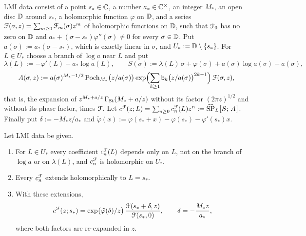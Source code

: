 \begin{defn}
\label{def:gam-lmidata}
LMI data consist of a point $s_*\in\mathbb{C}$, a number $a_*\in\mathbb{C}^\times$, an integer $M_*$, an open disc $\mathbb{D}$ around $s_*$, a holomorphic function $\varphi$ on $\mathbb{D}$, and a series $\mathcal{F}(\sigma,z)=\sum_{m\geq0}\mathcal{F}_m(\sigma)z^m$ of holomorphic functions on $\mathbb{D}$, such that $\mathcal{F}_0$ has no zero on $\mathbb{D}$ and $a_*+(\sigma-s_*)\varphi''(\sigma)\neq0$ for every $\sigma\in\mathbb{D}$. Put $a(\sigma):=a_*(\sigma-s_*)$, which is exactly linear in $\sigma$, and $U_*:=\mathbb{D}\setminus\{s_*\}$. For $L\in U_*$ choose a branch of $\log a$ near $L$ and put
\[
\lambda(L):=-\varphi'(L)-a_*\log a(L),\qquad S(\sigma):=\lambda(L)\,\sigma+\varphi(\sigma)+a(\sigma)\log a(\sigma)-a(\sigma),
\]
\[
A(\sigma,z):=a(\sigma)^{M_*-1/2}\,\mathrm{Poch}_{M_*}\bigl(z/a(\sigma)\bigr)\exp\Bigl(\sum_{k\geq1}\mathsf{b}_k\bigl(z/a(\sigma)\bigr)^{2k-1}\Bigr)\,\mathcal{F}(\sigma,z),
\]
that is, the expansion of $z^{M_*+a/z}\,\Gamma_{\mathrm{St}}(M_*+a/z)$ without its factor $(2\pi z)^{1/2}$ and without its phase factor, times $\mathcal{F}$. Let $c^{\mathcal{F}}(z;L)=\sum_{n\geq0}c^{\mathcal{F}}_n(L)z^n:=\widehat{\mathrm{SP}}_L\bigl[S;\,A\bigr]$. Finally put $\delta:=-M_*z/a_*$ and $\tilde\varphi(x):=\varphi(s_*+x)-\varphi(s_*)-\varphi'(s_*)x$.
\end{defn}

\begin{thm}
\label{thm:gam-lmi}
Let LMI data be given.
\begin{enumerate}
\item For $L\in U_*$ every coefficient $c^{\mathcal{F}}_n(L)$ depends only on $L$, not on the branch of $\log a$ or on $\lambda(L)$, and $c^{\mathcal{F}}_n$ is holomorphic on $U_*$.
\item Every $c^{\mathcal{F}}_n$ extends holomorphically to $L=s_*$.
\item With these extensions,
\[
c^{\mathcal{F}}(z;s_*)=\exp\bigl(\tilde\varphi(\delta)/z\bigr)\,\frac{\mathcal{F}(s_*+\delta,z)}{\mathcal{F}(s_*,0)},\qquad\delta=-\frac{M_*z}{a_*},
\]
where both factors are re-expanded in $z$.
\end{enumerate}
\end{thm}

